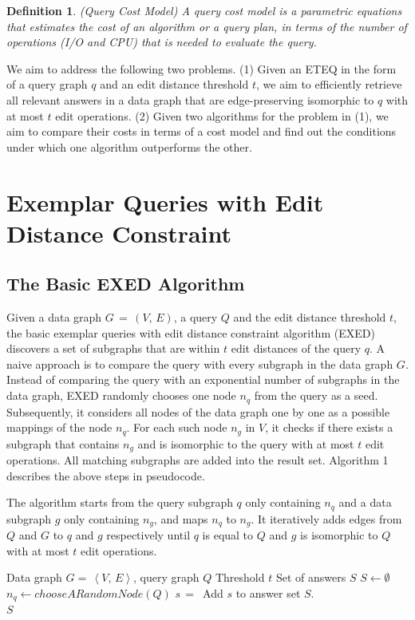 \documentclass{sigmod}
\newtheorem{definition}{Definition}
\begin{document}
\begin{definition}{(Query Cost Model)}
A query cost  model is a parametric equations that estimates the cost of an algorithm or a query plan, in terms of the number of operations (I/O and CPU) that is needed to evaluate the query.
\end{definition}

 We aim to address the following two problems. (1) Given an ETEQ in the form of a query graph $q$ and an edit distance threshold $t$, we aim to efficiently retrieve all relevant answers in a data graph that are edge-preserving isomorphic to $q$ with at most $t$ edit operations. (2) Given two algorithms for the problem in (1), we aim to compare their costs in terms of a cost model and find out the conditions under which one algorithm outperforms the other. 

\section{Exemplar Queries with Edit Distance Constraint}
\subsection{The Basic EXED Algorithm}
Given a data graph $G\,=\,(V,\,E)$, a query $Q$ and the edit distance threshold $t$, the basic exemplar queries with edit distance constraint algorithm (EXED) discovers a set of subgraphs that are within $t$ edit distances of the query $q$. A naive approach is to compare the query with every subgraph in the data graph $G$. Instead of comparing the query with an exponential number of subgraphs in the data graph, EXED randomly chooses one node $n_q$ from the query as a seed. Subsequently, it considers all nodes of the data graph one by one as a possible mappings of the node $n_q$. For each such node $n_g$ in $V$,  it checks if there exists a subgraph that contains $n_g$ and is isomorphic to the query with at most $t$ edit operations. All matching subgraphs are added into the result set. Algorithm 1 describes the above steps in pseudocode.

The algorithm starts from the query subgraph $q$ only containing $n_q$ and a data subgraph $g$ only containing $n_g$, and maps $n_q$ to $n_g$. It iteratively adds edges from $Q$ and $G$ to $q$ and $g$ respectively until $q$ is equal to $Q$ and $g$ is isomorphic to $Q$ with at most $t$ edit operations. 
\begin{algorithm}
\caption{}
\label{EXED}
\begin{algorithmic}[1]
\INPUT Data graph $G=\,\left \langle V,\,E\right\rangle$, query graph $Q$
\INPUT Threshold $t$
\OUTPUT Set of answers $S$
\State $S \leftarrow \emptyset$
\State $n_q \leftarrow chooseARandomNode(Q)$
\State $s\,=\,$ 
	\State Add $s$ to answer set $S$.
\EndIf
\EndFor \\
\Return $S$
\end{algorithmic}

\end{algorithm} 
\end{document}
